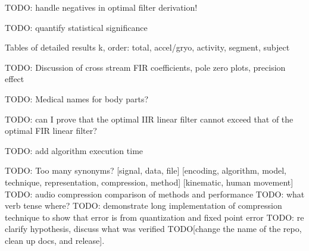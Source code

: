 \documentclass[journal]{IEEEtran}
\begin{document}
TODO: handle negatives in optimal filter derivation!

TODO: quantify statistical significance

Tables of detailed results k, order: total, accel/gryo, activity, segment, subject 

TODO: Discussion of cross stream FIR coefficients, pole zero plots, precision effect

TODO: Medical names for body parts?

TODO: can I prove that the optimal IIR linear filter cannot exceed that of the optimal FIR linear filter?

TODO: add algorithm execution time

TODO: Too many synonyms? [signal, data, file] [encoding, algorithm, model, technique, representation, compression, method] [kinematic, human movement]
TODO: audio compression comparison of methods and performance
TODO: what verb tense where?
TODO: demonstrate long implementation of compression technique to show that error is from quantization and fixed point error
TODO: re clarify hypothesis, discuss what was verified
TODO[change the name of the repo, clean up docs, and release]. 
\end{document}
